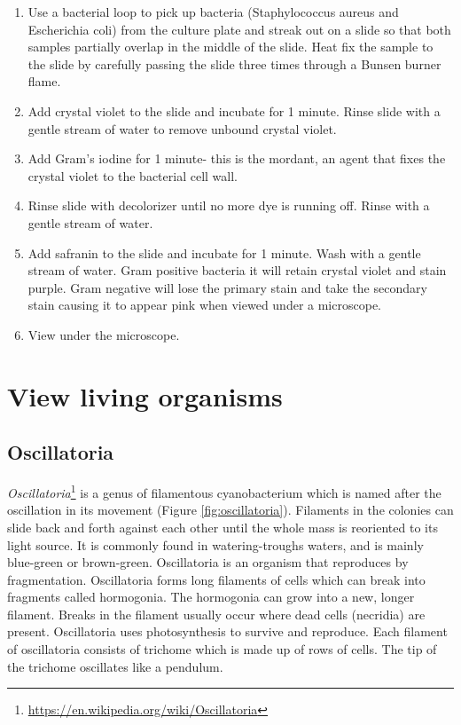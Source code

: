 \documentclass[]{book}
\providecommand{\tightlist}{%
  \setlength{\itemsep}{0pt}\setlength{\parskip}{0pt}}
\let\rmarkdownfootnote\footnote%
\def\footnote{\protect\rmarkdownfootnote}
\renewcommand{\href}[2]{#2\footnote{\url{#1}}}
\theoremstyle{definition}
\theoremstyle{definition}
\theoremstyle{definition}
\theoremstyle{remark}
\begin{document}
\begin{enumerate}
\def\labelenumi{\arabic{enumi}.}
\tightlist
\item
  Use a bacterial loop to pick up bacteria (Staphylococcus aureus and
  Escherichia coli) from the culture plate and streak out on a slide so
  that both samples partially overlap in the middle of the slide. Heat
  fix the sample to the slide by carefully passing the slide three times
  through a Bunsen burner flame.
\item
  Add crystal violet to the slide and incubate for 1 minute. Rinse slide
  with a gentle stream of water to remove unbound crystal violet.
\item
  Add Gram's iodine for 1 minute- this is the mordant, an agent that
  fixes the crystal violet to the bacterial cell wall.
\item
  Rinse slide with decolorizer until no more dye is running off. Rinse
  with a gentle stream of water.
\item
  Add safranin to the slide and incubate for 1 minute. Wash with a
  gentle stream of water. Gram positive bacteria it will retain crystal
  violet and stain purple. Gram negative will lose the primary stain and
  take the secondary stain causing it to appear pink when viewed under a
  microscope.
\item
  View under the microscope.
\end{enumerate}

\section{View living organisms}\label{view-living-organisms}

\subsection{Oscillatoria}\label{oscillatoria}

\href{https://en.wikipedia.org/wiki/Oscillatoria}{\emph{Oscillatoria}}
is a genus of filamentous cyanobacterium which is named after the
oscillation in its movement (Figure \ref{fig:oscillatoria}). Filaments
in the colonies can slide back and forth against each other until the
whole mass is reoriented to its light source. It is commonly found in
watering-troughs waters, and is mainly blue-green or brown-green.
Oscillatoria is an organism that reproduces by fragmentation.
Oscillatoria forms long filaments of cells which can break into
fragments called hormogonia. The hormogonia can grow into a new, longer
filament. Breaks in the filament usually occur where dead cells
(necridia) are present. Oscillatoria uses photosynthesis to survive and
reproduce. Each filament of oscillatoria consists of trichome which is
made up of rows of cells. The tip of the trichome oscillates like a
pendulum.
\end{document}

